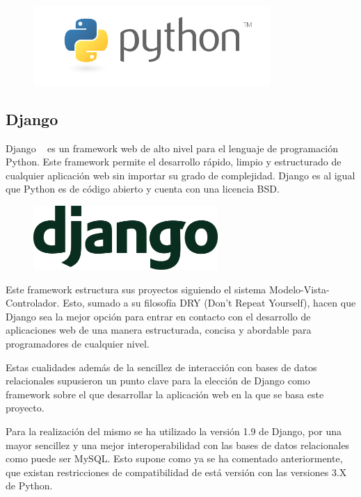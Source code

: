 \documentclass[a4paper, spanish, 12pt]{book}
\begin{document}
\begin{figure}[H]
  \centering
  \includegraphics[width=9cm, keepaspectratio]{img/python-logo}
\end{figure}

\subsection{Django}
\label{subsec:django}

Django ~\cite{django} es un framework web de alto nivel para el lenguaje de
programaci\'on Python. Este framework permite el desarrollo r\'apido, limpio y
estructurado de cualquier aplicaci\'on web sin importar su grado de complejidad.
Django es al igual que Python es de c\'odigo abierto y cuenta con una licencia BSD.

\begin{figure}[H]
  \centering
  \includegraphics[width=7cm, keepaspectratio]{img/django-logo}
\end{figure}

Este framework estructura sus proyectos siguiendo el sistema Modelo-Vista-Controlador.
Esto, sumado a su filosof\'ia DRY (Don't Repeat Yourself), hacen que Django sea
la mejor opci\'on para entrar en contacto con el desarrollo de aplicaciones web
de una manera estructurada, concisa y abordable para programadores de cualquier
nivel.

Estas cualidades adem\'as de la sencillez de interacci\'on con bases de datos
relacionales supusieron un punto clave para la elecci\'on de Django como
framework sobre el que desarrollar la aplicaci\'on web en la que se basa este proyecto.

Para la realizaci\'on del mismo se ha utilizado la versi\'on 1.9 de Django, por una
mayor sencillez y una mejor interoperabilidad con las bases de datos relacionales
como puede ser MySQL. Esto supone como ya se ha comentado anteriormente, que existan
restricciones de compatibilidad de est\'a versi\'on con las versiones 3.X de Python.
\end{document}
